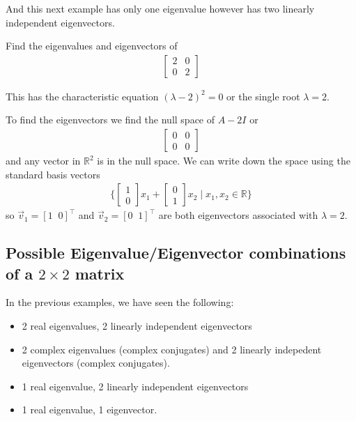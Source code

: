 And this next example has only one eigenvalue however has two linearly independent eigenvectors.  

\begin{example} \label{ex:eigs:scale2}
Find the eigenvalues and eigenvectors of 
%
\begin{align*}
\begin{bmatrix}
2 & 0 \\ 0 & 2
\end{bmatrix}
\end{align*}

This has the characteristic equation $(\lambda-2)^2 = 0$ or the single root $\lambda = 2$.  

To find the eigenvectors we find the null space of $A-2I$ or 
%
\begin{align*}
\begin{bmatrix}
0 & 0 \\ 0 & 0 
\end{bmatrix} 
\end{align*}
%
and any vector in $\mathbb{R}^2$ is in the null space.  We can write down the space using the standard basis vectors 
%
\begin{align*}
\{ \begin{bmatrix}
1 \\ 0 
\end{bmatrix} x_1 + \begin{bmatrix}
0 \\ 1
\end{bmatrix} x_2 \;|\; x_1, x_2 \in \mathbb{R} \}
\end{align*}
so $\vec{v}_1 = [1\;\;0]^{\intercal}$ and $\vec{v}_2=[0\; \;1]^{\intercal}$ are both eigenvectors associated with $\lambda=2$.  
\end{example}

\subsection*{Possible Eigenvalue/Eigenvector combinations of a $2\times 2$ matrix}

In the previous examples, we have seen the following:
%
\begin{itemize}
\item 2 real eigenvalues, 2 linearly independent eigenvectors 
\item 2 complex eigenvalues (complex conjugates) and 2 linearly indepedent eigenvectors (complex conjugates).  
\item 1 real eigenvalue, 2 linearly independent eigenvectors
\item 1 real eigenvalue, 1 eigenvector.
\end{itemize}

